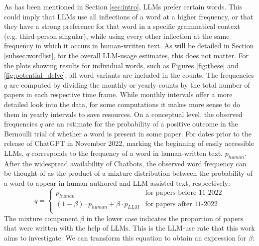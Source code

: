 As has been mentioned in Section \ref{sec:intro}, LLMs prefer certain words.
This could imply that LLMs use all inflections of a word at a higher frequency, or that they have a strong preference for that word in a specific grammatical context (e.g. third-person singular), while using every other inflection at the same frequency in which it occurs in human-written text.
As will be detailed in Section \ref{subsec:wordlist}, for the overall LLM-usage estimates, this does not matter. 
For the plots showing results for individual words, such as Figures \ref{fig:these} and \ref{fig:potential_delve}, all word variants are included in the counts.
The frequencies $q$ are computed by dividing the monthly or yearly counts by the total number of papers in each respective time frame.
While monthly intervals offer a more detailed look into the data, for some computations it makes more sense to do them in yearly intervals to save resources.
On a conceptual level, the observed frequencies $q$ are an estimate for the probability of a positive outcome in the Bernoulli trial of whether a word is present in some paper.
For dates prior to the release of ChatGPT in November 2022, marking the beginning of easily accessible LLMs, $q$ corresponds to the frequency of a word in human-written text, $p_{human}$.
After the widespread availability of Chatbots, the observed word frequency can be thought of as the product of a mixture distribution between the probability of a word to appear in human-authored and LLM-assisted text, respectively: 
\begin{equation}
    q = 
    \begin{cases}
        p_{human} & \text{for papers before 11-2022}\\
        (1-\beta) \cdot p_{human} + \beta \cdot p_{LLM} & \text{for papers after 11-2022}\\
    \end{cases}
\end{equation}
The mixture component $\beta$ in the lower case indicates the proportion of papers that were written with the help of LLMs.
This is the LLM-use rate that this work aims to investigate.
We can transform this equation to obtain an expression for $\beta$:

